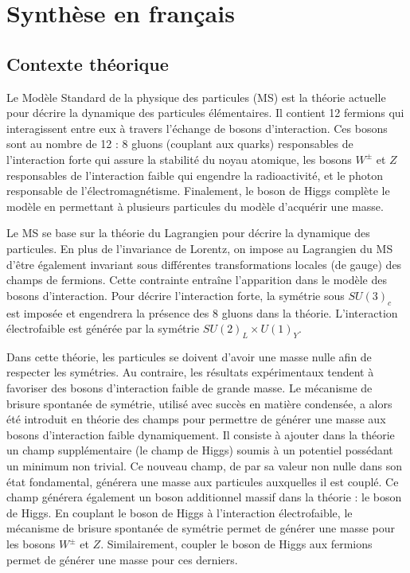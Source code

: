 \chapter{Synthèse en français}

\section{Contexte théorique}
Le Modèle Standard de la physique des particules (MS) est la théorie actuelle pour décrire la dynamique des particules élémentaires.
Il contient 12 fermions qui interagissent entre eux à travers l'échange de bosons d'interaction.
Ces bosons sont au nombre de 12 : 8 gluons (couplant aux quarks) responsables de l'interaction forte qui assure la stabilité du noyau atomique, les bosons $W^\pm$ et $Z$ responsables de l'interaction faible qui engendre la radioactivité, et le photon responsable de l'électromagnétisme.
Finalement, le boson de Higgs complète le modèle en permettant à plusieurs particules du modèle d'acquérir une masse.

Le MS se base sur la théorie du Lagrangien pour décrire la dynamique des particules.
En plus de l'invariance de Lorentz, on impose au Lagrangien du MS d'être également invariant sous différentes transformations locales (de gauge) des champs de fermions.
Cette contrainte entraîne l'apparition dans le modèle des bosons d'inte\-raction.
Pour décrire l'interaction forte, la symétrie sous $SU(3)_c$ est imposée et engendrera la présence des 8 gluons dans la théorie.
L'interaction électrofaible est générée par la symétrie $SU(2)_L\times U(1)_Y$.

Dans cette théorie, les particules se doivent d'avoir une masse nulle afin de respecter les symétries.
Au contraire, les résultats expérimentaux tendent à favoriser des bosons d'interaction faible de grande masse.
Le mécanisme de brisure spontanée de symétrie, utilisé avec succès en matière condensée, a alors été introduit en théorie des champs pour permettre de générer une masse aux bosons d'interaction faible dynamiquement.
Il consiste à ajouter dans la théorie un champ supplémentaire (le champ de Higgs) soumis à un potentiel possédant un minimum non trivial.
Ce nouveau champ, de par sa valeur non nulle dans son état fondamental, générera une masse aux particules auxquelles il est couplé.
Ce champ générera également un boson additionnel massif dans la théorie : le boson de Higgs.
En couplant le boson de Higgs à l'interaction électrofaible, le mécanisme de brisure spontanée de symétrie permet de générer une masse pour les bosons $W^\pm$ et $Z$.
Similairement, coupler le boson de Higgs aux fermions permet de générer une masse pour ces derniers.

